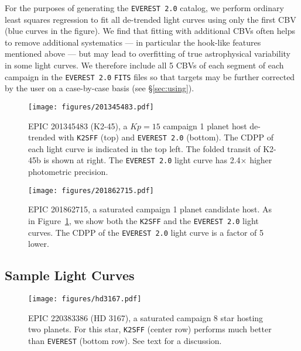 \documentclass[]{aastex62}
\newcommand{\Kp}{\ensuremath{Kp}}
\newcommand{\edited}[1]{{\color{red} #1}}
\begin{document}
For the purposes of generating the \texttt{EVEREST 2.0} catalog,
we perform ordinary least squares regression to fit all de-trended light curves
using only the first CBV (blue curves in the figure). We find that fitting with additional CBVs often helps
to remove additional systematics --- in particular the hook-like features mentioned above
--- but may lead to overfitting of true astrophysical variability in some light curves.
We therefore include all 5 CBVs of each segment of each campaign in the \texttt{EVEREST 2.0} \texttt{FITS} files
so that targets may be further corrected by the user on a case-by-case basis (see \S\ref{sec:using}).


\begin{figure}[hbt]
  \begin{center}
      \texttt{[image: figures/201345483.pdf]}
       \caption{EPIC 201345483 (K2-45), a $\Kp = 15$ campaign 1 planet host de-trended
       with \texttt{K2SFF} (top) and \texttt{EVEREST 2.0} (bottom). The CDPP of each light curve
       is indicated in the top left. The folded transit of K2-45b is shown at right. The \texttt{EVEREST 2.0}
       light curve has 2.4$\times$ higher photometric precision.}
     \label{fig:201345483}
  \end{center}
\end{figure}

\begin{figure}[hbt]
  \begin{center}
      \texttt{[image: figures/201862715.pdf]}
       \caption{EPIC 201862715, a saturated campaign 1 planet candidate host. As in
       Figure~\ref{fig:201345483}, we show both the \texttt{K2SFF} and the \texttt{EVEREST 2.0}
       light curves. The CDPP of the \texttt{EVEREST 2.0} light curve is a factor of 5 lower.}
     \label{fig:201862715}
  \end{center}
\end{figure}

\subsection{Sample Light Curves}
\label{sec:sample}

\begin{figure}[hbt]
  \begin{center}
      \texttt{[image: figures/hd3167.pdf]}
       \caption{\edited{EPIC 220383386 (HD 3167), a saturated campaign 8 star hosting two
       planets. For this star,
       \texttt{K2SFF} (center row) performs much better than \texttt{EVEREST} (bottom row).
       See text for a discussion.}}
     \label{fig:hd3167}
  \end{center}
\end{figure}
\end{document}
